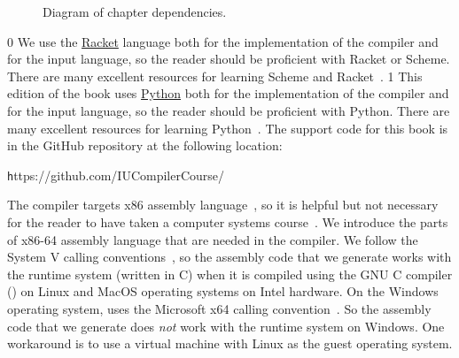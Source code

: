 \documentclass[7x10]{TimesAPriori_MIT}%
\def\racketEd{0}
\def\pythonEd{1}
\def\edition{0}
\newcommand{\racket}[1]{{\if\edition\racketEd{#1}\fi}}
\newcommand{\python}[1]{{\if\edition\pythonEd #1\fi}}
\numberwithin{theorem}{chapter}
\numberwithin{definition}{chapter}
\numberwithin{equation}{chapter}
\begin{document}
\begin{figure}[tp]
\begin{tcolorbox}[colback=white]
{
\fi}
\end{tcolorbox}
\caption{Diagram of chapter dependencies.}
\label{fig:chapter-dependences}
\end{figure}

\racket{
We use the \href{https://racket-lang.org/}{Racket} language both for
the implementation of the compiler and for the input language, so the
reader should be proficient with Racket or Scheme. There are many
excellent resources for learning Scheme and
Racket~\citep{Dybvig:1987aa,Abelson:1996uq,Friedman:1996aa,Felleisen:2001aa,Felleisen:2013aa,Flatt:2014aa}.
}
\python{
  This edition of the book uses \href{https://www.python.org/}{Python}
  both for the implementation of the compiler and for the input language, so the
reader should be proficient with Python. There are many
excellent resources for learning Python~\citep{Lutz:2013vp,Barry:2016vj,Sweigart:2019vn,Matthes:2019vs}.
}
The support code for this book is in the GitHub repository at
the following location:
\begin{center}\small\texttt
  https://github.com/IUCompilerCourse/
\end{center}

The compiler targets x86 assembly language~\citep{Intel:2015aa}, so it
is helpful but not necessary for the reader to have taken a computer
systems course~\citep{Bryant:2010aa}. We introduce the parts of x86-64
assembly language that are needed in the compiler.
%
We follow the System V calling
conventions~\citep{Bryant:2005aa,Matz:2013aa}, so the assembly code
that we generate works with the runtime system (written in C) when it
is compiled using the GNU C compiler () on Linux and MacOS
operating systems on Intel hardware.
%
On the Windows operating system,  uses the Microsoft x64
calling convention~\citep{Microsoft:2018aa,Microsoft:2020aa}. So the
assembly code that we generate does \emph{not} work with the runtime
system on Windows. One workaround is to use a virtual machine with
Linux as the guest operating system.
\end{document}
